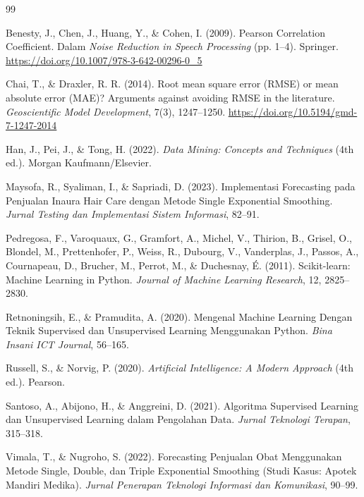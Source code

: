 \documentclass[a4paper,oneside,12pt]{report}
\begin{document}
\begin{thebibliography}{99}

Benesty, J., Chen, J., Huang, Y., \& Cohen, I. (2009). Pearson Correlation Coefficient. Dalam \textit{Noise Reduction in Speech Processing} (pp. 1--4). Springer. \url{https://doi.org/10.1007/978-3-642-00296-0_5}

Chai, T., \& Draxler, R. R. (2014). Root mean square error (RMSE) or mean absolute error (MAE)? Arguments against avoiding RMSE in the literature. \textit{Geoscientific Model Development}, 7(3), 1247--1250. \url{https://doi.org/10.5194/gmd-7-1247-2014}

Han, J., Pei, J., \& Tong, H. (2022). \textit{Data Mining: Concepts and Techniques} (4th ed.). Morgan Kaufmann/Elsevier.

Maysofa, R., Syaliman, I., \& Sapriadi, D. (2023). Implementasi Forecasting pada Penjualan Inaura Hair Care dengan Metode Single Exponential Smoothing. \textit{Jurnal Testing dan Implementasi Sistem Informasi}, 82--91.

Pedregosa, F., Varoquaux, G., Gramfort, A., Michel, V., Thirion, B., Grisel, O., Blondel, M., Prettenhofer, P., Weiss, R., Dubourg, V., Vanderplas, J., Passos, A., Cournapeau, D., Brucher, M., Perrot, M., \& Duchesnay, \'E. (2011). Scikit-learn: Machine Learning in Python. \textit{Journal of Machine Learning Research}, 12, 2825--2830.

Retnoningsih, E., \& Pramudita, A. (2020). Mengenal Machine Learning Dengan Teknik Supervised dan Unsupervised Learning Menggunakan Python. \textit{Bina Insani ICT Journal}, 56--165.

Russell, S., \& Norvig, P. (2020). \textit{Artificial Intelligence: A Modern Approach} (4th ed.). Pearson.

Santoso, A., Abijono, H., \& Anggreini, D. (2021). Algoritma Supervised Learning dan Unsupervised Learning dalam Pengolahan Data. \textit{Jurnal Teknologi Terapan}, 315--318.

Vimala, T., \& Nugroho, S. (2022). Forecasting Penjualan Obat Menggunakan Metode Single, Double, dan Triple Exponential Smoothing (Studi Kasus: Apotek Mandiri Medika). \textit{Jurnal Penerapan Teknologi Informasi dan Komunikasi}, 90--99.

\end{thebibliography}
\end{document}
